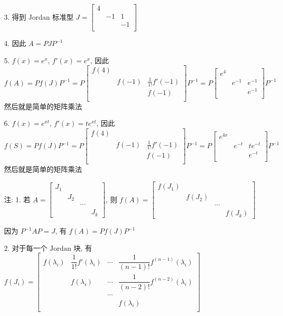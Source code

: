 \documentclass[a4paper, draft]{article}
\begin{document}
3. 得到 Jordan 标准型 $J=\begin{bmatrix}
4&&\\
&-1&1\\
&&-1\\
\end{bmatrix}$

4. 因此 $A=PJP^{-1}$

5. $f(x)=e^{x}$, $f'(x)=e^{x}$, 
因此 $f(A)=Pf(J)P^{-1}=P\begin{bmatrix}
f(4)&&\\
&f(-1)&\frac{1}{1!}f'(-1)\\
&&f(-1)\\
\end{bmatrix}P^{-1}=P\begin{bmatrix}
e^{4}&&\\
&e^{-1}&e^{-1}\\
&&e^{-1}\\
\end{bmatrix}P^{-1}$ 然后就是简单的矩阵乘法

6. $f(x)=e^{xt}$, $f'(x)=te^{xt}$, 因此 $f(S)=Pf(J)P^{-1}=P\begin{bmatrix}
f(4)&&\\
&f(-1)&\frac{1}{1!}f'(-1)\\
&&f(-1)\\
\end{bmatrix}P^{-1}=P\begin{bmatrix}
e^{4x}&&\\
&e^{-t}&te^{-t}\\
&&e^{-t}\\
\end{bmatrix}P^{-1}$ 然后就是简单的矩阵乘法


注:  
1. 若 $A=\begin{bmatrix}
J_1&&&\\
&J_2&&\\
&&\cdots&\\
&&&J_k
\end{bmatrix}$, 则 $f(A)=\begin{bmatrix}
f(J_1)&&&\\
&f(J_2)&&\\
&&\cdots&\\
&&&f(J_k)
\end{bmatrix}$

因为 $P^{-1}AP=J$, 有 $f(A)=Pf(J)P^{-1}$

2. 对于每一个 $\text{Jordan}$ 块, 有 $f(J_i)=\begin{bmatrix}
f(\lambda_i)&\dfrac{1}{1!}f'(\lambda_i)&\cdots&\dfrac{1}{(n-1)!}f^{(n-1)}(\lambda_i)\\
&f(\lambda_i)&\cdots&\dfrac{1}{(n-2)!}f^{(n-2)}(\lambda_i)\\
&&\cdots&\\
&&&f(\lambda_i)\\
\end{bmatrix}$
\end{document}
